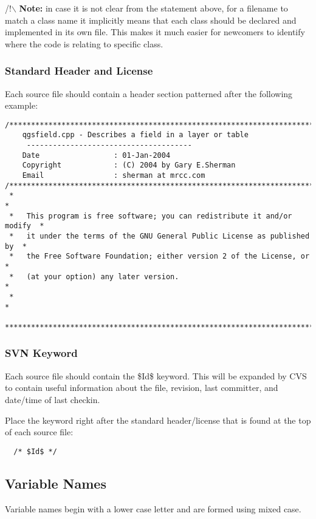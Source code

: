 /!$\backslash$ \textbf{Note:} in case it is not clear from the statement above, for a filename 
to match a class name it implicitly means that each class should be declared 
and implemented in its own file. This makes it much easier for newcomers to 
identify where the code is relating to specific class.

\subsubsection{Standard Header and License}
Each source file should contain a header section patterned after the following
example:

\begin{verbatim}
/***************************************************************************
    qgsfield.cpp - Describes a field in a layer or table
     --------------------------------------
    Date                 : 01-Jan-2004
    Copyright            : (C) 2004 by Gary E.Sherman
    Email                : sherman at mrcc.com
/***************************************************************************
 *                                                                         *
 *   This program is free software; you can redistribute it and/or modify  *
 *   it under the terms of the GNU General Public License as published by  *
 *   the Free Software Foundation; either version 2 of the License, or     *
 *   (at your option) any later version.                                   *
 *                                                                         *
 ***************************************************************************/
\end{verbatim}

\subsubsection{SVN Keyword}
Each source file should contain the \$Id\$ keyword. This will be expanded by CVS
to contain useful information about the file, revision, last committer, and
date/time of last checkin.

Place the keyword right after the standard header/license that is found at the
top of each source file:

\begin{verbatim}
  /* $Id$ */
\end{verbatim}

\subsection{Variable Names}
Variable names begin with a lower case letter and are formed using mixed case.

